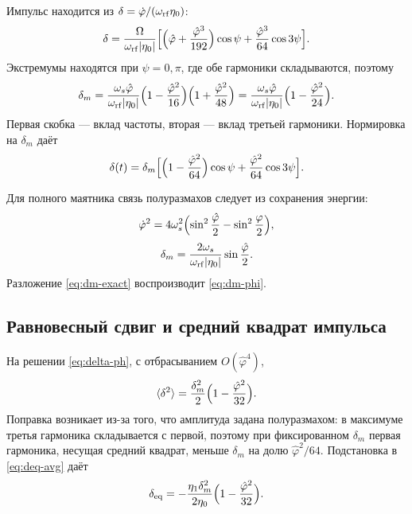 Импульс находится из $\delta=\dot\varphi/(\omega_{\mathrm{rf}}\eta_0)$:
\begin{equation}
\label{eq:delta-raw-ph}
\delta
=\frac{\Omega}{\omega_{\mathrm{rf}}|\eta_0|}
\Bigl[
\Bigl(\hat\varphi+\frac{\hat\varphi^3}{192}\Bigr)\cos\psi
+\frac{\hat\varphi^3}{64}\cos 3\psi
\Bigr].
\end{equation}
Экстремумы находятся при $\psi=0,\pi$, где обе гармоники складываются, поэтому
\begin{equation}
\label{eq:dm-phi}
\delta_m
=\frac{\omega_s\hat\varphi}{\omega_{\mathrm{rf}}|\eta_0|}
\Bigl(1-\frac{\hat\varphi^2}{16}\Bigr)
\Bigl(1+\frac{\hat\varphi^2}{48}\Bigr)
=\frac{\omega_s\hat\varphi}{\omega_{\mathrm{rf}}|\eta_0|}
\Bigl(1-\frac{\hat\varphi^2}{24}\Bigr).
\end{equation}
Первая скобка --- вклад частоты, вторая --- вклад третьей гармоники. Нормировка на $\delta_m$ даёт
\begin{equation}
\label{eq:delta-ph}
\delta(t)
=\delta_m\Bigl[
\Bigl(1-\frac{\hat\varphi^2}{64}\Bigr)\cos\psi
+\frac{\hat\varphi^2}{64}\cos 3\psi
\Bigr].
\end{equation}

Для полного маятника связь полуразмахов следует из сохранения энергии:
\begin{equation}
\label{eq:phidot-exact}
\dot\varphi^2
=4\omega_s^2
\Bigl(
\sin^2\frac{\hat\varphi}{2}-\sin^2\frac{\varphi}{2}
\Bigr),
\end{equation}
\begin{equation}
\label{eq:dm-exact}
\delta_m
=\frac{2\omega_s}{\omega_{\mathrm{rf}}|\eta_0|}
\sin\frac{\hat\varphi}{2}.
\end{equation}
Разложение \eqref{eq:dm-exact} воспроизводит \eqref{eq:dm-phi}.

\subsection{Равновесный сдвиг и средний квадрат импульса}

На решении \eqref{eq:delta-ph}, с отбрасыванием $O(\hat\varphi^4)$,
\begin{equation}
\label{eq:d2-ph}
\langle\delta^2\rangle
=\frac{\delta_m^2}{2}\Bigl(1-\frac{\hat\varphi^2}{32}\Bigr).
\end{equation}
Поправка возникает из-за того, что амплитуда задана полуразмахом: в максимуме третья гармоника складывается с первой, поэтому при фиксированном $\delta_m$ первая гармоника, несущая средний квадрат, меньше $\delta_m$ на долю $\hat\varphi^2/64$. Подстановка в \eqref{eq:deq-avg} даёт
\begin{equation}
\label{eq:deq-ph}
\delta_{\mathrm{eq}}
=-\frac{\eta_1\delta_m^2}{2\eta_0}
\Bigl(1-\frac{\hat\varphi^2}{32}\Bigr).
\end{equation}

